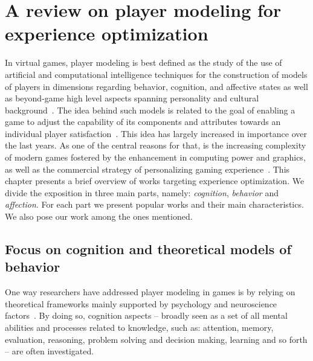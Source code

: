 \chapter{A review on player modeling for experience optimization}\label{ch:review_playing_optimization}
In virtual games, player modeling is best defined as the study of the use of artificial and computational intelligence techniques for the construction of models of players in dimensions regarding behavior, cognition, and affective states as well as beyond-game high level aspects spanning personality and cultural background~\citep{yannakakis_player_2013}. The idea behind such models is related to the goal of enabling a game to adjust the capability of its components and attributes towards an individual player satisfaction~\citep{herik_opponent_2005}. This idea has largely increased in importance over the last years. As one of the central reasons for that, is the increasing complexity of modern games fostered by the enhancement in computing power and graphics, as well as the commercial strategy of personalizing gaming experience~\citep{teng_customization_2010, herik_opponent_2005}. This chapter presents a brief overview of works targeting experience optimization. We divide the exposition in three main parts, namely: \textit{cognition}, \textit{behavior} and \textit{affection}. For each part we present popular works and their main characteristics. We also pose our work among the ones mentioned.

\section{Focus on cognition and theoretical models of behavior}
One way researchers have addressed player modeling in games is by relying on theoretical frameworks mainly supported by psychology and neuroscience factors~\citep{yannakakis_player_2013}. By doing so, cognition aspects -- broadly seen as a set of all mental abilities and processes related to knowledge, such as: attention, memory, evaluation, reasoning, problem solving and decision making, learning and so forth -- are often investigated. 


